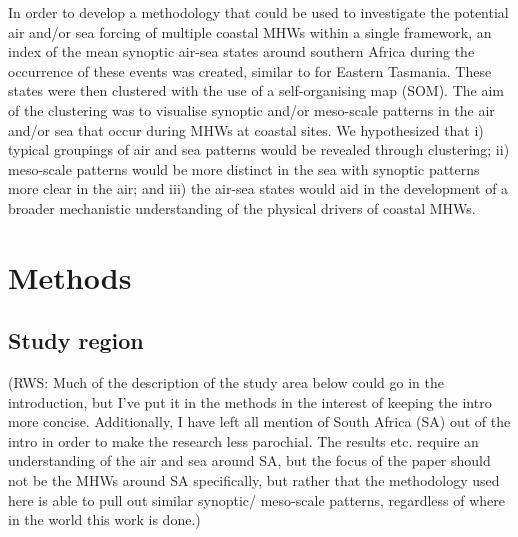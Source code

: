\documentclass[a4paper,10pt,review]{elsarticle}
\begin{document}
In order to develop a methodology that could be used to investigate the potential air and/or sea forcing of multiple coastal MHWs within a single framework, an index of the mean synoptic air-sea states around southern Africa during the occurrence of these events was created, similar to \citet{Oliver2017atlas} for Eastern Tasmania. These states were then clustered with the use of a self-organising map (SOM). The aim of the clustering was to visualise synoptic and/or meso-scale patterns in the air and/or sea that occur during MHWs at coastal sites. We hypothesized that i) typical groupings of air and sea patterns would be revealed through clustering; ii) meso-scale patterns would be more distinct in the sea with synoptic patterns more clear in the air; and iii) the air-sea states would aid in the development of a broader mechanistic understanding of the physical drivers of coastal MHWs.

\section{Methods}
\subsection{Study region}
(RWS: Much of the description of the study area below could go in the introduction, but I've put it in the methods in the interest of keeping the intro more concise. Additionally, I have left all mention of South Africa (SA) out of the intro in order to make the research less parochial. The results etc. require an understanding of the air and sea around SA, but the focus of the paper should not be the MHWs around SA specifically, but rather that the methodology used here is able to pull out similar synoptic/ meso-scale patterns, regardless of where in the world this work is done.)
\end{document}
